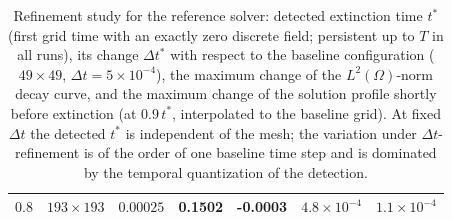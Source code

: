 \documentclass[11pt]{elsarticle}
\theoremstyle{definition}
\theoremstyle{remark}
\numberwithin{equation}{section}
\begin{document}
\begin{table}[htbp]
{\begin{tabular}{lcccccc}
  $0.8$ & $193\times193$ & $0.00025$ & 0.1502 & -0.0003 & $4.8\times 10^{-4}$ & $1.1\times 10^{-4}$ \\
  \bottomrule
  \end{tabular}}
  \caption{Refinement study for the reference solver: detected extinction
    time $t^*$ (first grid time with an exactly zero discrete field;
    persistent up to $T$ in all runs), its change $\Delta t^*$ with
    respect to the baseline configuration ($49\times49$,
    $\Delta t=5\times10^{-4}$), the maximum change of the
    $L^2(\Omega)$-norm decay curve, and the maximum change of the
    solution profile shortly before extinction (at $0.9\,t^*$,
    interpolated to the baseline grid). At fixed $\Delta t$ the detected
    $t^*$ is independent of the mesh; the variation under
    $\Delta t$-refinement is of the order of one baseline time step and
    is dominated by the temporal quantization of the detection.}
  \label{tab:relay-ref-convergence}
\end{table}
\end{document}
